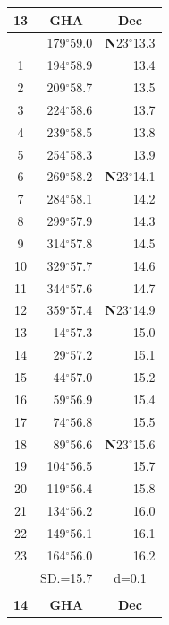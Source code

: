 \documentclass[10pt, a4paper]{report}
\begin{document}
\begin{scriptsize}
\begin{tabular*}{0.2\textwidth}[t]{@{\extracolsep{\fill}}|c|rr|}
\hline
\multicolumn{1}{|c|}{\rule{0pt}{2.6ex}\textbf{13}} & \multicolumn{1}{c}{\textbf{GHA}} & \multicolumn{1}{c|}{\textbf{Dec}}\\
\hline\rule{0pt}{2.6ex}\noindent
0 & 179$^\circ$59.0 & \textbf{N}23$^\circ$13.3\\
1 & 194$^\circ$58.9 & 13.4\\
2 & 209$^\circ$58.7 & 13.5\\
3 & 224$^\circ$58.6 & \raisebox{0.24ex}{\boldmath$\cdot$~\boldmath$\cdot$~~}13.7\\
4 & 239$^\circ$58.5 & 13.8\\
5 & 254$^\circ$58.3 & 13.9\\[2Pt]
6 & 269$^\circ$58.2 & \textbf{N}23$^\circ$14.1\\
7 & 284$^\circ$58.1 & 14.2\\
8 & 299$^\circ$57.9 & 14.3\\
9 & 314$^\circ$57.8 & \raisebox{0.24ex}{\boldmath$\cdot$~\boldmath$\cdot$~~}14.5\\
10 & 329$^\circ$57.7 & 14.6\\
11 & 344$^\circ$57.6 & 14.7\\[2Pt]
12 & 359$^\circ$57.4 & \textbf{N}23$^\circ$14.9\\
13 & 14$^\circ$57.3 & 15.0\\
14 & 29$^\circ$57.2 & 15.1\\
15 & 44$^\circ$57.0 & \raisebox{0.24ex}{\boldmath$\cdot$~\boldmath$\cdot$~~}15.2\\
16 & 59$^\circ$56.9 & 15.4\\
17 & 74$^\circ$56.8 & 15.5\\[2Pt]
18 & 89$^\circ$56.6 & \textbf{N}23$^\circ$15.6\\
19 & 104$^\circ$56.5 & 15.7\\
20 & 119$^\circ$56.4 & 15.8\\
21 & 134$^\circ$56.2 & \raisebox{0.24ex}{\boldmath$\cdot$~\boldmath$\cdot$~~}16.0\\
22 & 149$^\circ$56.1 & 16.1\\
23 & 164$^\circ$56.0 & 16.2\\
\hline
\rule{0pt}{2.4ex} & \multicolumn{1}{c}{SD.=15.7} & \multicolumn{1}{c|}{d=0.1}\\
\hline
\multicolumn{1}{c}{}\\[-0.5ex]\hline
\multicolumn{1}{|c|}{\rule{0pt}{2.6ex}\textbf{14}} & \multicolumn{1}{c}{\textbf{GHA}} & \multicolumn{1}{c|}{\textbf{Dec}}\\

\end{tabular*}
\end{scriptsize}
\end{document}
